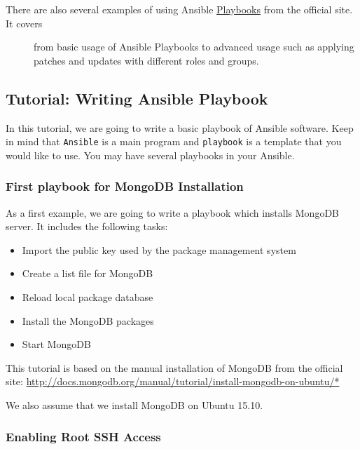 \begin{description}
\item[There are also several examples of using Ansible
\href{http://docs.ansible.com/playbooks.html}{Playbooks} from the
official site. It covers]
from basic usage of Ansible Playbooks to advanced usage such as applying
patches and updates with different roles and groups.
\end{description}

\subsection{Tutorial: Writing Ansible
Playbook}\label{tutorial-writing-ansible-playbook}

In this tutorial, we are going to write a basic playbook of Ansible
software. Keep in mind that \texttt{Ansible} is a main program and
\texttt{playbook} is a template that you would like to use. You may have
several playbooks in your Ansible.

\subsubsection{First playbook for MongoDB
Installation}\label{first-playbook-for-mongodb-installation}

As a first example, we are going to write a playbook which installs
MongoDB server. It includes the following tasks:

\begin{itemize}
\tightlist
\item
  Import the public key used by the package management system
\item
  Create a list file for MongoDB
\item
  Reload local package database
\item
  Install the MongoDB packages
\item
  Start MongoDB
\end{itemize}

This tutorial is based on the manual installation of MongoDB from the
official site:
\url{http://docs.mongodb.org/manual/tutorial/install-mongodb-on-ubuntu/*}

We also assume that we install MongoDB on Ubuntu 15.10.

\subsubsection{Enabling Root SSH Access}\label{enabling-root-ssh-access}

